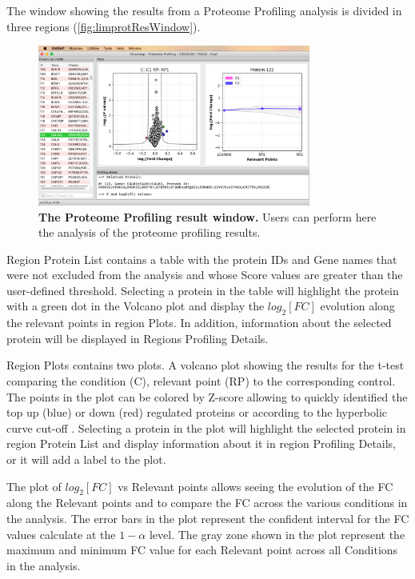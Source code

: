 The window showing the results from a Proteome Profiling analysis is divided in three
regions (\autoref{fig:limprotResWindow}).

\begin{figure}[h]
    \centering
    \includegraphics[width=0.8\textwidth]{./IMAGES/MOD-PROTPROF/protprof-frag.jpg}
    \caption[The Proteome Profiling result window]{\textbf{The Proteome Profiling
    result window.} Users can perform here the analysis of the proteome profiling
    results.} 
    \label{fig:protprofResultsWindow}
    \vspace{-5pt} 	
\end{figure}

Region Protein List contains a table with the protein IDs and Gene names that were not
excluded from the analysis and whose Score values are greater than the user-defined
threshold. Selecting a protein in the table will highlight the protein with a green
dot in the Volcano plot and display the $log_2[FC]$ evolution along the relevant points
in region Plots. In addition, information about the selected protein will be displayed
in Regions Profiling Details.

Region Plots contains two plots. A volcano plot showing the results for the t-test
comparing the condition (C), relevant point (RP) to the corresponding control. The
points in the plot can be colored by Z-score allowing to quickly identified the top
up (blue) or down (red) regulated proteins or according to the hyperbolic curve cut-off
\cite{LI2012}. Selecting a protein in the plot will highlight the selected protein
in region Protein List and display information about it in region Profiling Details,
or it will add a label to the plot.

The plot of $log_2[FC]$ vs Relevant points allows seeing the evolution of the FC
along the Relevant points and to compare the FC across the various conditions in
the analysis. The error bars in the plot represent the confident interval for the
FC values calculate at the $1-\alpha$ level. The gray zone shown in the plot represent
the maximum and minimum FC value for each Relevant point across all Conditions in
the analysis.

